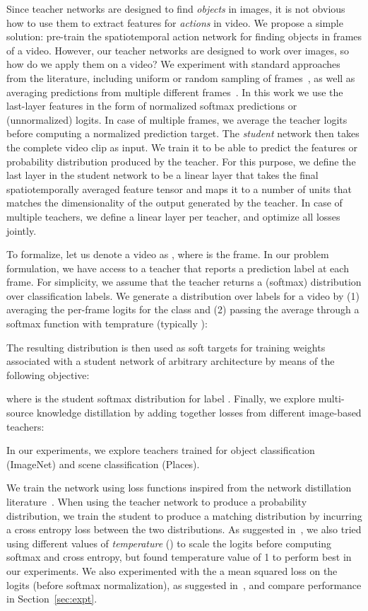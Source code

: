 \documentclass[10pt,twocolumn,letterpaper]{article}
\begin{document}
Since teacher networks are designed to find {\em objects
} in images, it is not obvious how to use them to extract features for {\em actions} in video. We propose a 
simple 
solution: pre-train the spatiotemporal action network for finding objects in frames of a video.
However, our teacher networks are designed to work over images, 
so how do we apply them on a video?
We experiment with standard
approaches from the literature, including uniform or random sampling of frames~\cite{Simonyan_14b},
as well as averaging predictions from multiple different frames~\cite{WangL_16a}.
In this work we use the last-layer features in the form of normalized softmax predictions or (unnormalized) logits.   
In case of multiple
frames, we average the teacher logits before computing a normalized prediction target.
The {\em student} network then takes the complete video clip as input.
We train it to be able to predict the features or probability distribution produced by the teacher.
For this purpose, we define the last layer in the student network to be a linear layer that takes the final spatiotemporally averaged feature tensor and maps it to a number of units that matches the dimensionality of the output generated by the teacher. In case of multiple teachers, we define 
a linear layer per teacher, and
optimize all losses jointly.

To formalize, let us denote a video as , where  is the  frame. In our problem formulation, we have access to a teacher that reports a prediction label at each frame. For simplicity, we assume that the teacher returns a (softmax) distribution over  classification labels. We generate a distribution over labels for a video by (1) averaging the per-frame logits for the  class  and (2) passing the average through a softmax function with temprature  (typically ):

The resulting distribution is then used as soft targets for training weights  associated with a student network  of arbitrary architecture by means of the following objective:

\noindent where  is the student softmax distribution for label . Finally, we explore multi-source knowledge distillation by adding together losses from different image-based teachers:

In our experiments, we explore teachers trained for object classification (ImageNet) and scene classification (Places).

We train the network using loss functions inspired from the network distillation literature~\cite{bucilua2006model,hinton2015distilling}. When using the teacher network to produce a probability
distribution, we train the student to produce a matching distribution by incurring a cross entropy loss between the two distributions.
As suggested in~\cite{hinton2015distilling}, we also tried using different
values of {\em temperature} () to scale the logits before computing softmax and cross entropy, but found temperature
value of 1 to perform best in our experiments. We also experimented with the a mean squared loss on the logits (before
softmax normalization), as suggested in~\cite{bucilua2006model}, and compare performance in Section~\ref{sec:expt}.
\end{document}
